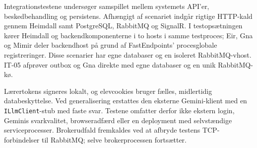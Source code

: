 Integrationstestene undersøger samspillet mellem systemets API'er,
beskedbehandling og persistens. Afhængigt af scenariet indgår rigtige HTTP-kald
gennem Heimdall samt PostgreSQL, RabbitMQ og SignalR. I testopsætningen kører Heimdall
og backendkomponenterne i to hosts i samme testproces; Eir, Gna og Mimir deler
backendhost på grund af FastEndpoints' procesglobale registreringer. Disse
scenarier har egne databaser og en isoleret RabbitMQ-vhost. IT-05 afprøver
outbox og Gna direkte med egne databaser og en unik RabbitMQ-kø.

Lærertokens signeres lokalt, og elevcookies bruger fælles, midlertidig
databeskyttelse. Ved generalisering erstattes den eksterne Gemini-klient med en
\texttt{ILlmClient}-stub med faste svar. Testene omfatter derfor ikke ekstern
login, Geminis svarkvalitet, browseradfærd eller en deployment med selvstændige
serviceprocesser. Brokerudfald fremkaldes ved at afbryde testens
TCP-forbindelser til RabbitMQ; selve brokerprocessen fortsætter.

